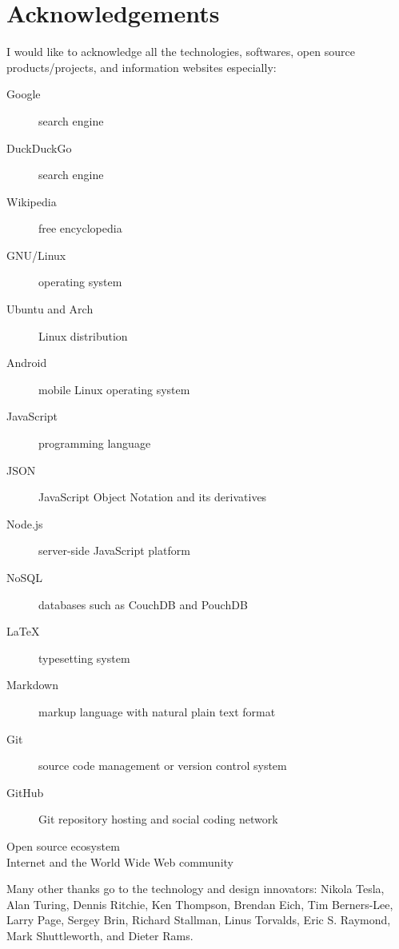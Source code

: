 
\begingroup
\let\clearpage\relax
\let\cleardoublepage\relax

\chapter{Acknowledgements}
\label{chap:acknowledgements}

I would like to acknowledge all the technologies, softwares, open source products/projects, and information websites especially:

\begin{description}
  \item[Google] search engine
  \item[DuckDuckGo] search engine
  \item[Wikipedia] free encyclopedia
  \item[GNU/Linux] operating system
  \item[Ubuntu and Arch] Linux distribution
  \item[Android] mobile Linux operating system
  \item[JavaScript] programming language
  \item[JSON] JavaScript Object Notation and its derivatives
  \item[Node.js] server-side JavaScript platform
  \item[NoSQL] databases such as CouchDB and PouchDB
  \item[LaTeX] typesetting system
  \item[Markdown] markup language with natural plain text format
  \item[Git] source code management or version control system
  \item[GitHub] Git repository hosting and social coding network
  \item[Open source ecosystem]
  \item[Internet and the World Wide Web community]
\end{description}

\noindent Many other thanks go to the technology and design innovators: Nikola Tesla, Alan Turing, Dennis Ritchie, Ken Thompson, Brendan Eich, Tim Berners-Lee, Larry Page, Sergey Brin, Richard Stallman, Linus Torvalds, Eric S. Raymond, Mark Shuttleworth, and Dieter Rams.

\endgroup
